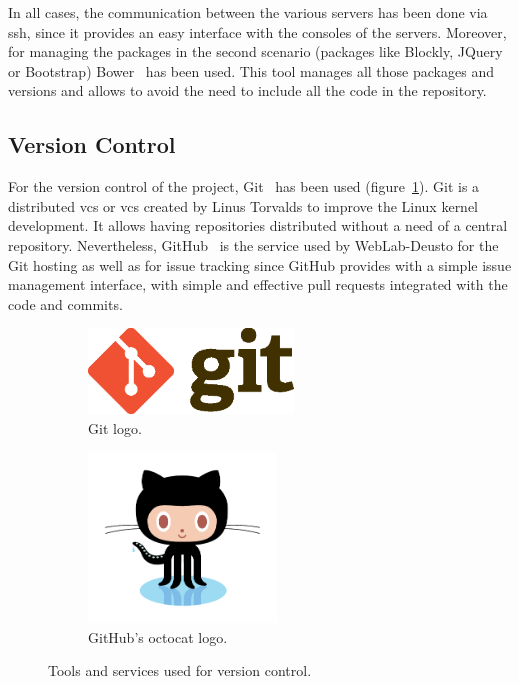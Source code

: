 In all cases, the communication between the various servers has been done via \acrshort{ssh}, since
it provides an easy interface with the consoles of the servers. Moreover, for managing the packages
in the second scenario (packages like Blockly, JQuery or Bootstrap) Bower~\cite{bower} has been
used. This tool manages all those packages and versions and allows to avoid the need to include all
the code in the repository.

\subsection{Version Control}

For the version control of the project, Git~\cite{git_web} has been used (figure~\ref{subfig:git}).
Git is a distributed \acrlong{vcs} or \acrshort{vcs} created by Linus Torvalds to improve the Linux
kernel development. It allows having repositories distributed without a need of a central
repository. Nevertheless, GitHub~\cite{github_web} is the service used by WebLab-Deusto for the Git
hosting as well as for issue tracking since GitHub provides with a simple issue management
interface, with simple and effective pull requests integrated with the code and commits.

\begin{figure}[!htbp]
	\centering
	\begin{subfigure}{0.6\textwidth}
		\centering
		\includegraphics[width=0.6\textwidth]{fig/git.eps}
		\caption{Git logo.}\label{subfig:git}
	\end{subfigure}\quad
	\begin{subfigure}{0.3\textwidth}
		\centering
		\includegraphics[width=0.55\textwidth]{fig/github}
		\caption{GitHub's octocat logo.}\label{subfig:github}
	\end{subfigure}\quad
	\caption{Tools and services used for version control.}
\end{figure}

